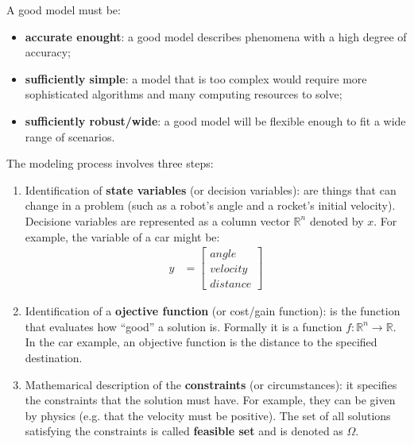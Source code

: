 A good model must be:
\begin{itemize}
    \item \textbf{accurate enought}: a good model describes phenomena with a high degree of accuracy;
    \item \textbf{sufficiently simple}: a model that is too complex would require more sophisticated algorithms and many computing resources to solve;
    \item \textbf{sufficiently robust/wide}: a good model will be flexible enough to fit a wide range of scenarios.
\end{itemize}

The modeling process involves three steps:
\begin{enumerate}
    \item Identification of \textbf{state variables} (or decision variables): are things that can change in a problem (such as a robot's angle and a rocket's initial velocity). Decisione variables are represented as a column vector \( \mathbb{R}^n \) denoted by \( x \). For example, the variable of a car might be:
    \begin{align*}
        y &= \begin{bmatrix}
                \mathit{angle} \\
                \mathit{velocity} \\
                \mathit{distance} 
             \end{bmatrix}
    \end{align*} 

    \item Identification of a \textbf{ojective function} (or cost/gain function): is the function that evaluates how ``good'' a solution is. Formally it is a function \( f : \mathbb{R}^n \rightarrow \mathbb{R} \). In the car example, an objective function is the distance to the specified destination.
    
    \item Mathemarical description of the \textbf{constraints} (or circumstances): it specifies the constraints that the solution must have. For example, they can be given by physics (e.g. that the velocity must be positive). 
    The set of all solutions satisfying the constraints is called \textbf{feasible set} and is denoted as \( \Omega \).
\end{enumerate}

